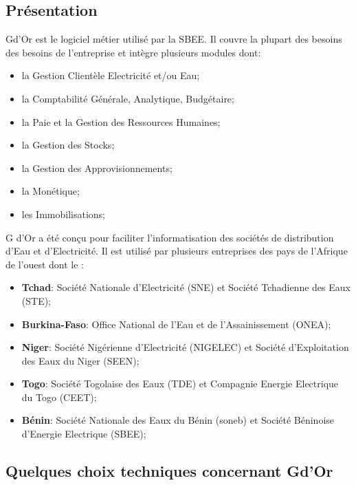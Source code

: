   
  \subsection{Pr\'esentation}
    Gd'Or est le logiciel m\'etier utilis\'e par la SBEE. Il couvre la plupart des besoins des besoins de l'entreprise et int\`egre plusieurs modules dont: 
    \begin{itemize}
      \item la Gestion Client\`ele Electricit\'e et/ou Eau;
      \item la Comptabilit\'e G\'en\'erale, Analytique, Budg\'etaire;
      \item la Paie et la Gestion des Ressources Humaines;
      \item la Gestion des Stocks;
      \item la Gestion des Approvisionnements;
      \item la Mon\'etique;
      \item les Immobilisations;
    \end{itemize}
    G d'Or a \'et\'e con\c{c}u pour faciliter l'informatisation des sociétés de distribution d'Eau et d'Electricité. 
    Il est utilis\'e par plusieurs entreprises des pays de l'Afrique de l'ouest dont le :
    \begin{itemize}
      \item \textbf{Tchad}: Société Nationale d’Electricité (SNE) et Société Tchadienne des Eaux (STE);
      \item \textbf{Burkina-Faso}: Office National de l’Eau et de l’Assainissement (ONEA);
      \item \textbf{Niger}: Société Nigérienne d'Electricité (NIGELEC) et Soci\'et\'e d'Exploitation des Eaux du Niger (SEEN);
      \item \textbf{Togo}: Société Togolaise des Eaux (TDE) et Compagnie Energie Electrique du Togo (CEET);
      \item \textbf{B\'enin}: Société Nationale des Eaux du B\'enin (\gls{soneb}) et Soci\'et\'e B\'eninoise d'Energie Electrique (SBEE);
    \end{itemize}
    
    \subsection{Quelques choix techniques concernant Gd'Or}
